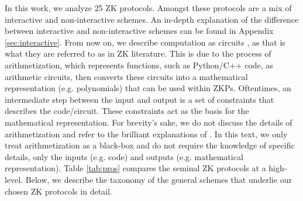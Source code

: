 In this work, we analyze 25 ZK protocols. Amongst these protocols are a mix of interactive and non-interactive schemes. An in-depth explanation of the difference between interactive and non-interactive schemes can be found in Appendix \ref{sec:interactive}. From now on, we describe computation as circuits \Cir, as that is what they are referred to as in ZK literature. This is due to the process of arithmetization, which represents functions, such as Python/C++ code, as arithmetic circuits, then converts these circuits into a mathematical representation (e.g. polynomials) that can be used within ZKPs. Oftentimes, an intermediate step between the input and output is a set of constraints that describes the code/circuit. These constraints act as the basis for the mathematical representation. For brevity's sake, we do not discuss the details of arithmetization and refer to the brilliant explanations of \cite{LambdaClass2023ArithmetizationSchemes, ButerinQuadraticArithmeticPrograms}. In this text, we only treat arithmetization as a black-box and do not require the knowledge of specific details, only the inputs (e.g. code) and outputs (e.g. mathematical representation). Table \ref{tab:pros} compares the seminal ZK protocols at a high-level. Below, we describe the taxonomy of the general schemes that underlie our chosen ZK protocols in detail. 



